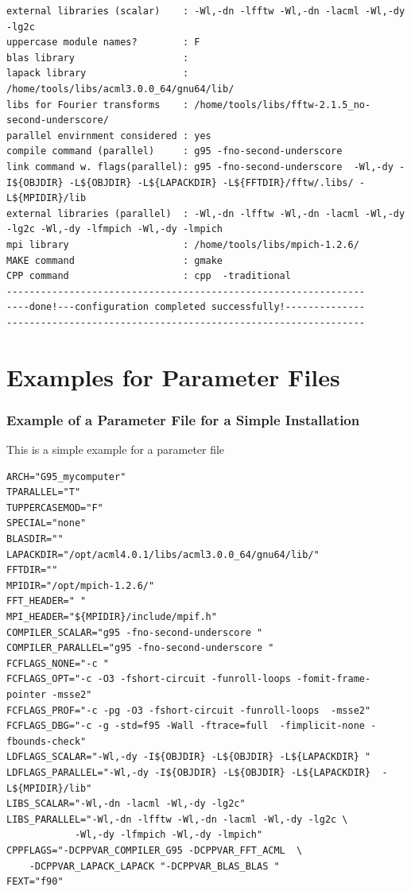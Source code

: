 \documentclass[a4paper,10pt]{report}
\begin{document}
\begin{verbatim}
external libraries (scalar)    : -Wl,-dn -lfftw -Wl,-dn -lacml -Wl,-dy -lg2c
uppercase module names?        : F
blas library                   :
lapack library                 : /home/tools/libs/acml3.0.0_64/gnu64/lib/
libs for Fourier transforms    : /home/tools/libs/fftw-2.1.5_no-second-underscore/
parallel envirnment considered : yes
compile command (parallel)     : g95 -fno-second-underscore
link command w. flags(parallel): g95 -fno-second-underscore  -Wl,-dy -I${OBJDIR} -L${OBJDIR} -L${LAPACKDIR} -L${FFTDIR}/fftw/.libs/ -L${MPIDIR}/lib
external libraries (parallel)  : -Wl,-dn -lfftw -Wl,-dn -lacml -Wl,-dy -lg2c -Wl,-dy -lfmpich -Wl,-dy -lmpich
mpi library                    : /home/tools/libs/mpich-1.2.6/
MAKE command                   : gmake
CPP command                    : cpp  -traditional
---------------------------------------------------------------
----done!---configuration completed successfully!--------------
---------------------------------------------------------------
\end{verbatim}
%
\newpage
\chapter{Examples for Parameter Files}
\label{sec:parmfiles}

\subsection{Example of a Parameter File for a Simple Installation}
\label{sec:parmfilesimple}
This is a simple example for a parameter file
\begin{verbatim}
ARCH="G95_mycomputer"
TPARALLEL="T"
TUPPERCASEMOD="F"
SPECIAL="none"
BLASDIR=""
LAPACKDIR="/opt/acml4.0.1/libs/acml3.0.0_64/gnu64/lib/"
FFTDIR=""     
MPIDIR="/opt/mpich-1.2.6/"
FFT_HEADER=" "   
MPI_HEADER="${MPIDIR}/include/mpif.h"
COMPILER_SCALAR="g95 -fno-second-underscore "
COMPILER_PARALLEL="g95 -fno-second-underscore "
FCFLAGS_NONE="-c "
FCFLAGS_OPT="-c -O3 -fshort-circuit -funroll-loops -fomit-frame-pointer -msse2"
FCFLAGS_PROF="-c -pg -O3 -fshort-circuit -funroll-loops  -msse2"
FCFLAGS_DBG="-c -g -std=f95 -Wall -ftrace=full  -fimplicit-none -fbounds-check"
LDFLAGS_SCALAR="-Wl,-dy -I${OBJDIR} -L${OBJDIR} -L${LAPACKDIR} "
LDFLAGS_PARALLEL="-Wl,-dy -I${OBJDIR} -L${OBJDIR} -L${LAPACKDIR}  -L${MPIDIR}/lib"
LIBS_SCALAR="-Wl,-dn -lacml -Wl,-dy -lg2c"
LIBS_PARALLEL="-Wl,-dn -lfftw -Wl,-dn -lacml -Wl,-dy -lg2c \
            -Wl,-dy -lfmpich -Wl,-dy -lmpich"
CPPFLAGS="-DCPPVAR_COMPILER_G95 -DCPPVAR_FFT_ACML  \
    -DCPPVAR_LAPACK_LAPACK "-DCPPVAR_BLAS_BLAS "
FEXT="f90"
\end{verbatim}
\end{document}
